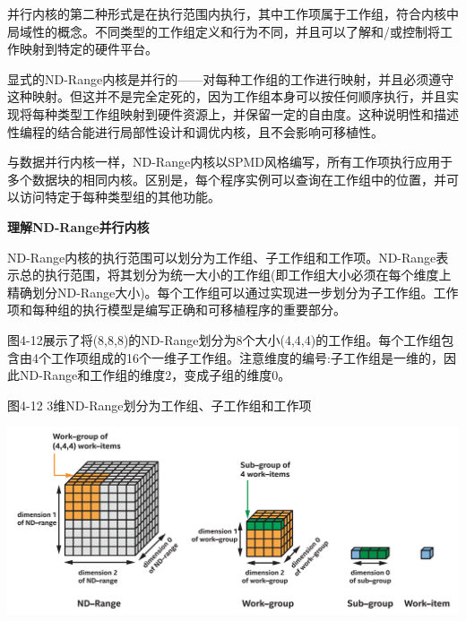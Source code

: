 并行内核的第二种形式是在执行范围内执行，其中工作项属于工作组，符合内核中局域性的概念。不同类型的工作组定义和行为不同，并且可以了解和/或控制将工作映射到特定的硬件平台。\par

显式的ND-Range内核是并行的——对每种工作组的工作进行映射，并且必须遵守这种映射。但这并不是完全定死的，因为工作组本身可以按任何顺序执行，并且实现将每种类型工作组映射到硬件资源上，并保留一定的自由度。这种说明性和描述性编程的结合能进行局部性设计和调优内核，且不会影响可移植性。\par

与数据并行内核一样，ND-Range内核以SPMD风格编写，所有工作项执行应用于多个数据块的相同内核。区别是，每个程序实例可以查询在工作组中的位置，并可以访问特定于每种类型组的其他功能。\par

\hspace*{\fill} \par %
\textbf{理解ND-Range并行内核}

ND-Range内核的执行范围可以划分为工作组、子工作组和工作项。ND-Range表示总的执行范围，将其划分为统一大小的工作组(即工作组大小必须在每个维度上精确划分ND-Range大小)。每个工作组可以通过实现进一步划分为子工作组。工作项和每种组的执行模型是编写正确和可移植程序的重要部分。\par

图4-12展示了将(8,8,8)的ND-Range划分为8个大小(4,4,4)的工作组。每个工作组包含由4个工作项组成的16个一维子工作组。注意维度的编号:子工作组是一维的，因此ND-Range和工作组的维度2，变成子组的维度0。\par

\hspace*{\fill} \par %
图4-12 3维ND-Range划分为工作组、子工作组和工作项
\begin{center}
	\includegraphics[width=1.\textwidth]{content/chapter-4/images/5}
\end{center}

